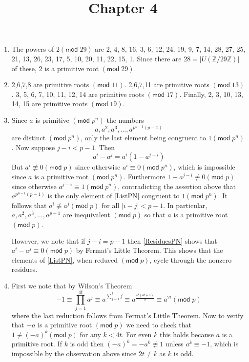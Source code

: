 \documentclass[12pt]{article}
\title{Chapter 4}
\author{}\date{}
\renewcommand{\pmod}[1]{\left(\mathsf{mod}\;#1\right)}
\begin{document}
\maketitle
\thispagestyle{empty}

\begin{enumerate}
\item %
The powers of $2\pmod{29}$ are
2, 4, 8, 16, 3, 6, 12, 24, 19, 9,
7, 14, 28, 27, 25, 21, 13, 26, 23, 17, 5, 10, 20, 11, 22, 15, 1.
Since there are $28=\left|U\left(\mathbb{Z}/29\mathbb{Z}\right)\right|$
of these, $2$ is a primitive root $\pmod{29}$.

\item %
2,6,7,8 are primitive roots $\pmod{11}$.
2,6,7,11 are primitive roots $\pmod{13}$.
3, 5, 6, 7, 10, 11, 12, 14 are primitive roots $\pmod{17}$.
Finally, 2, 3, 10, 13, 14, 15 are primitive roots $\pmod{19}$.

\item %
Since $a$ is primitive $\pmod{p^n}$ the numbers
\begin{equation}\label{ListPN}
a,a^2,a^3,\ldots,a^{p^{n-1}\left(p-1\right)}
\end{equation}
are distinct $\pmod{p^n}$, only the last element being
congruent to $1\pmod{p^n}$.
Now suppose $j-i<p-1$. Then
\begin{equation}\label{ResiduesPN}
a^i-a^j=a^i\left(1-a^{j-i}\right)
\end{equation}
But $a^i\not\equiv 0\pmod{p}$
since otherwise $a^i\equiv 0\pmod{p^n}$, which is impossible
since $a$ is a primitive root $\pmod{p^n}$.
Furthermore $1-a^{j-i}\not\equiv 0\pmod{p}$ since otherwise
$a^{j-i}\equiv 1\pmod{p^n}$, contradicting the assertion
above that
$a^{p^{n-1}\left(p-1\right)}$ is the only element of
\autoref{ListPN} congruent to $1\pmod{p^n}$.
It follows that $a^i\not\equiv a^j\pmod{p}$ for all
$\left|i-j\right|<p-1$. In particular, $a,a^2,a^3,\ldots,a^{p-1}$
are inequivalent $\pmod{p}$ so that $a$ is a primitive root
$\pmod{p}$.

However, we note that if $j-i=p-1$ then \autoref{ResiduesPN}
shows that $a^i-a^j\equiv 0\pmod{p}$ by Fermat's Little Theorem.
This shows that the elements of \autoref{ListPN}, when reduced
$\pmod{p}$, cycle through the nonzero residues.

\item\label{2T+1} %
First we note that by Wilson's Theorem
\[-1\equiv\prod_{j=1}^{4t}a^j
\equiv a^{\sum_{j=1}^kj}
\equiv a^{\frac{4t\left(4t+1\right)}{2}}
\equiv a^{2t}\pmod{p}\]
where the last reduction follows from Fermat's Little Theorem.
Now to verify that $-a$ is a primitive root $\pmod{p}$
we need to check that $1\not\equiv\left(-a\right)^k\pmod{p}$
for any $k<4t$. For even $k$ this holds because $a$ is a primitive root.
If $k$ is odd then
$\left(-a\right)^k=-a^k\not\equiv 1$ unless
$a^k\equiv -1$, which is impossible by the observation above
since $2t\ne k$ as $k$ is odd.


\end{enumerate}
\end{document}
